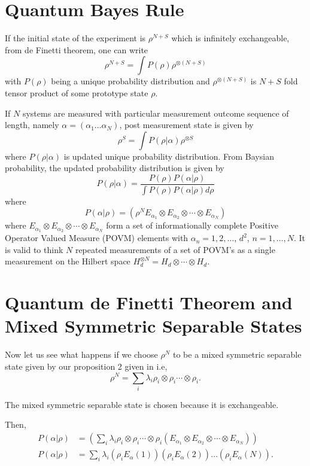 \section{Quantum Bayes Rule}\label{chap27-sec4}

If the initial state of the experiment is  $\rho^{N+S}$ which is infinitely exchangeable, from de Finetti theorem, one can write 
$$
\rho^{N+S} = \int P(\rho) \rho^{\otimes(N+S)}
$$ 
with $P(\rho)$ being a unique probability distribution and $\rho^{\otimes(N+S)}$ is $N+S$ fold tensor product of some prototype state $\rho$.

If $N$ systems are measured with particular measurement outcome sequence of length, namely $\alpha = (\alpha_{1} \ldots \alpha_{N})$, post measurement state is given by 
$$
\rho^{S} = \int P(\rho|\alpha) \rho^{\otimes S}
$$ 
\cite{chap27-key10} where $P(\rho|\alpha)$ is updated unique probability distribution. From Baysian probability, the updated probability distribution is given by 
$$
P(\rho|\alpha) = \frac{P(\rho)P(\alpha|\rho)}{\int P(\rho)P(\alpha|\rho) d\rho}
$$ 
where
$$
P(\alpha|\rho) = (\rho^{N} E_{\alpha_{1}} \otimes E_{\alpha_{2}} \otimes \cdots \otimes E_{\alpha_{N}})
$$
where $E_{\alpha_{1}} \otimes E_{\alpha_{2}} \otimes \cdots \otimes E_{\alpha_{N}}$ form a set of informationally complete Positive Operator Valued Measure (POVM) elements with $\alpha_{n} = 1, 2, \ldots$, $d^{2}$, $n = 1, \ldots,N$. It is valid to think $N$ repeated measurements of a set of POVM's as a single measurement on the Hilbert space $H_{d}^{\otimes N} = H_{d} \otimes \cdots \otimes H_{d}$.

\section{Quantum de Finetti Theorem and Mixed Symmetric Separable States}\label{chap27-sec5}

Now let us see what happens if we choose $\rho^{N}$ to be a mixed symmetric separable state given by our proposition 2 given in \cite{chap27-key11} i.e, 
$$
\rho^{N} = \sum_{i} \lambda_{i} \rho_{i} \otimes \rho_{i} \cdots \otimes \rho_{i}.
$$

The mixed symmetric separable state is chosen because it is exchangeable.

Then, 
\begin{align*}
P(\alpha|\rho) & = \left(\sum_{i} \lambda_{i} \rho_{i} \otimes \rho_{i} \cdots \otimes \rho_{i} (E_{\alpha_{1}} \otimes E_{\alpha_{2}} \otimes \cdots \otimes E_{\alpha_{N}})\right) \\
P(\alpha|\rho) & = \sum_{i} \lambda_{i} (\rho_{i} E_{\alpha}(1)) (\rho_{i} E_{\alpha}(2)) \ldots (\rho_{i} E_{\alpha}(N)).
\end{align*}

